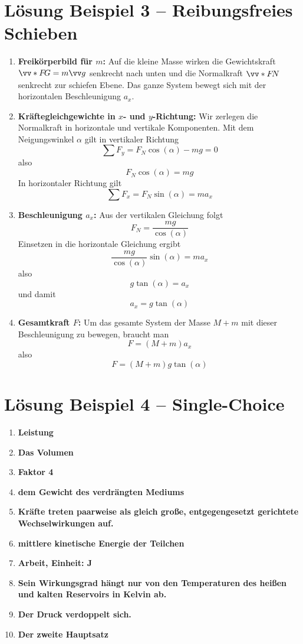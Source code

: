 \documentclass[11pt, a4paper]{article}
\begin{document}
\section*{Lösung Beispiel 3 -- Reibungsfreies Schieben}
\begin{enumerate}
    \item \textbf{Freikörperbild für $m$:}
    Auf die kleine Masse wirken die Gewichtskraft $\ivecS{F}{G} = m\ivec{g}$ senkrecht nach unten und die Normalkraft $\ivecS{F}{N}$ senkrecht zur schiefen Ebene. Das ganze System bewegt sich mit der horizontalen Beschleunigung $a_x$.

    \item \textbf{Kräftegleichgewichte in $x$- und $y$-Richtung:}
    Wir zerlegen die Normalkraft in horizontale und vertikale Komponenten. Mit dem Neigungswinkel $\alpha$ gilt in vertikaler Richtung
    \[
        \sum F_y = F_N\cos(\alpha) - mg = 0
    \]
    also
    \[
        F_N\cos(\alpha) = mg
    \]
    In horizontaler Richtung gilt
    \[
        \sum F_x = F_N\sin(\alpha) = m a_x
    \]

    \item \textbf{Beschleunigung $a_x$:}
    Aus der vertikalen Gleichung folgt
    \[
        F_N = \frac{mg}{\cos(\alpha)}
    \]
    Einsetzen in die horizontale Gleichung ergibt
    \[
        \frac{mg}{\cos(\alpha)}\sin(\alpha) = m a_x
    \]
    also
    \[
        g\tan(\alpha) = a_x
    \]
    und damit
    \[
        a_x = g\tan(\alpha)
    \]

    \item \textbf{Gesamtkraft $F$:}
    Um das gesamte System der Masse $M+m$ mit dieser Beschleunigung zu bewegen, braucht man
    \[
        F = (M+m) a_x
    \]
    also
    \[
        F = (M+m) g\tan(\alpha)
    \]
\end{enumerate}

\newpage

\section*{Lösung Beispiel 4 -- Single-Choice}
\begin{enumerate}
    \item \textbf{Leistung}
    \item \textbf{Das Volumen}
    \item \textbf{Faktor 4}
    \item \textbf{dem Gewicht des verdrängten Mediums}
    \item \textbf{Kräfte treten paarweise als gleich große, entgegengesetzt gerichtete Wechselwirkungen auf.}
    \item \textbf{mittlere kinetische Energie der Teilchen}
    \item \textbf{Arbeit, Einheit: \si{\joule}}
    \item \textbf{Sein Wirkungsgrad hängt nur von den Temperaturen des heißen und kalten Reservoirs in Kelvin ab.}
    \item \textbf{Der Druck verdoppelt sich.}
    \item \textbf{Der zweite Hauptsatz}
\end{enumerate}
\end{document}
